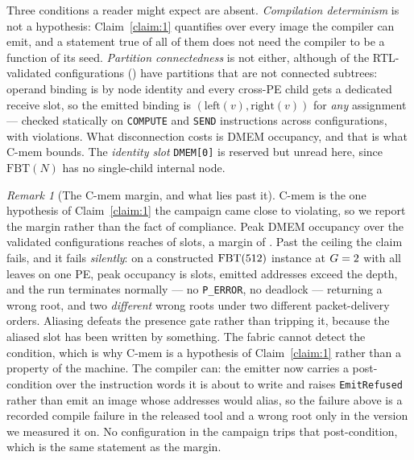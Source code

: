 \documentclass[journal,10pt]{IEEEtran}
\theoremstyle{plain}
\theoremstyle{definition}
\theoremstyle{remark}
\newtheorem{remark}{Remark}
\newcommand{\FBT}{\ensuremath{\mathrm{FBT}}}
\newcommand{\sv}[1]{\texttt{#1}}
\begin{document}
Three conditions a reader might expect are absent. \emph{Compilation
determinism} is not a hypothesis: Claim~\ref{claim:1} quantifies over every
image the compiler can emit, and a statement true of all of them does not need
the compiler to be a function of its seed. \emph{Partition connectedness} is
not either, although \DisconnCount{} of the RTL-validated configurations
(\DisconnShare{}) have partitions that are not connected subtrees: operand
binding is by node identity and every cross-PE child gets a dedicated receive
slot, so the emitted binding is $(\mathrm{left}(v),\mathrm{right}(v))$ for
\emph{any} assignment --- checked statically on \BindComputes{}
\texttt{COMPUTE} and \BindSends{} \texttt{SEND} instructions across
\BindConfigs{} configurations, with \BindViolations{} violations. What
disconnection costs is DMEM occupancy, and that is what \textsf{C-mem} bounds.
The \emph{identity slot} \texttt{DMEM[0]} is reserved but unread here, since
$\FBT(N)$ has no single-child internal node.

\begin{remark}[The \textsf{C-mem} margin, and what lies past it]
\label{rem:cmem}
\textsf{C-mem} is the one hypothesis of Claim~\ref{claim:1} the campaign came
close to violating, so we report the margin rather than the fact of
compliance. Peak DMEM occupancy over the validated configurations reaches
\DmemPeakMax{} of \DmemDepth{} slots, a margin of \DmemMargin. Past the
ceiling the claim fails, and it fails \emph{silently}: on a constructed
$\FBT(\DmemCexLeaves)$ instance at $G = 2$ with all leaves on
one PE, peak occupancy is \DmemCexPeak{} slots, \DmemCexOver{} emitted
addresses exceed the depth, and the run terminates normally --- no
\texttt{P\_ERROR}, no deadlock --- returning a wrong root, and two
\emph{different} wrong roots under two different packet-delivery orders.
Aliasing defeats the presence gate rather than tripping it, because the
aliased slot has been written by something. The fabric cannot detect the
condition, which is why \textsf{C-mem} is a hypothesis of Claim~\ref{claim:1}
rather than a property of the machine. The compiler can: the emitter now
carries a post-condition over the instruction words it is about to write and
raises \sv{EmitRefused} rather than emit an image whose addresses would
alias, so the failure above is a recorded compile failure in the released
tool and a wrong root only in the version we measured it on. No configuration
in the campaign trips that post-condition, which is the same statement as the
margin.
\end{remark}
\end{document}
